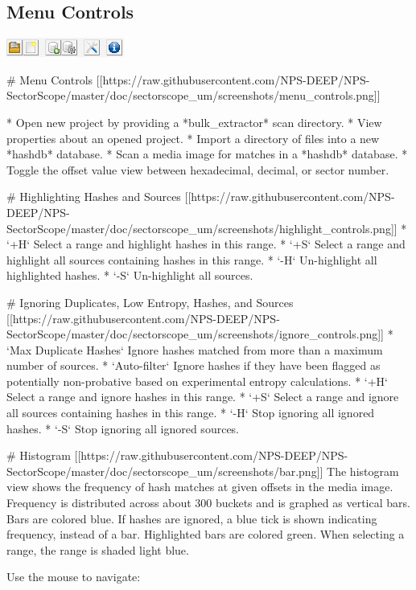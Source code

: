 \documentclass[11pt,fleqn]{article} %
\begin{document}
\begin{itemize}
\subsection{Menu Controls}
\includegraphics[scale=.8]{screenshots/menu_controls}



# Menu Controls
[[https://raw.githubusercontent.com/NPS-DEEP/NPS-SectorScope/master/doc/sectorscope_um/screenshots/menu_controls.png]]

* Open new project by providing a *bulk_extractor* scan directory.
* View properties about an opened project.
* Import a directory of files into a new *hashdb* database.
* Scan a media image for matches in a *hashdb* database.
* Toggle the offset value view between hexadecimal, decimal, or sector number.

# Highlighting Hashes and Sources
[[https://raw.githubusercontent.com/NPS-DEEP/NPS-SectorScope/master/doc/sectorscope_um/screenshots/highlight_controls.png]]
* `+H` Select a range and highlight hashes in this range.
* `+S` Select a range and highlight all sources containing hashes in this range.
* `-H` Un-highlight all highlighted hashes.
* `-S` Un-highlight all sources.

# Ignoring Duplicates, Low Entropy, Hashes, and Sources
[[https://raw.githubusercontent.com/NPS-DEEP/NPS-SectorScope/master/doc/sectorscope_um/screenshots/ignore_controls.png]]
* `Max Duplicate Hashes` Ignore hashes matched from more than a maximum number of sources.
* `Auto-filter` Ignore hashes if they have been flagged as potentially non-probative based on experimental entropy calculations.
* `+H` Select a range and ignore hashes in this range.
* `+S` Select a range and ignore all sources containing hashes in this range.
* `-H` Stop ignoring all ignored hashes.
* `-S` Stop ignoring all ignored sources.

# Histogram
[[https://raw.githubusercontent.com/NPS-DEEP/NPS-SectorScope/master/doc/sectorscope_um/screenshots/bar.png]]
The histogram view shows the frequency of hash matches at given offsets in the media image.
Frequency is distributed across about 300 buckets and is graphed as vertical bars.
Bars are colored blue.  If hashes are ignored, a blue tick is shown indicating frequency, instead of a bar.
Highlighted bars are colored green.
When selecting a range, the range is shaded light blue.

Use the mouse to navigate:


\end{itemize}
\end{document}
